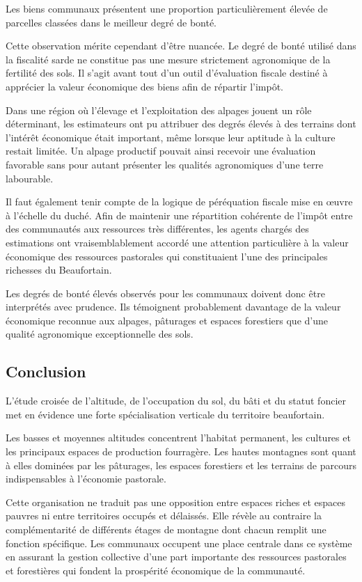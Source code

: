 \documentclass[12pt,a4paper]{report}
\begin{document}
	
	Les biens communaux présentent une proportion particulièrement élevée de parcelles classées dans le meilleur degré de bonté.
	
	Cette observation mérite cependant d'être nuancée. Le degré de bonté utilisé dans la fiscalité sarde ne constitue pas une mesure strictement agronomique de la fertilité des sols. Il s'agit avant tout d'un outil d'évaluation fiscale destiné à apprécier la valeur économique des biens afin de répartir l'impôt.
	
	Dans une région où l'élevage et l'exploitation des alpages jouent un rôle déterminant, les estimateurs ont pu attribuer des degrés élevés à des terrains dont l'intérêt économique était important, même lorsque leur aptitude à la culture restait limitée. Un alpage productif pouvait ainsi recevoir une évaluation favorable sans pour autant présenter les qualités agronomiques d'une terre labourable.
	
	Il faut également tenir compte de la logique de péréquation fiscale mise en œuvre à l'échelle du duché. Afin de maintenir une répartition cohérente de l'impôt entre des communautés aux ressources très différentes, les agents chargés des estimations ont vraisemblablement accordé une attention particulière à la valeur économique des ressources pastorales qui constituaient l'une des principales richesses du Beaufortain.
	
	Les degrés de bonté élevés observés pour les communaux doivent donc être interprétés avec prudence. Ils témoignent probablement davantage de la valeur économique reconnue aux alpages, pâturages et espaces forestiers que d'une qualité agronomique exceptionnelle des sols.
	
\subsection{Conclusion}
	
	L'étude croisée de l'altitude, de l'occupation du sol, du bâti et du statut foncier met en évidence une forte spécialisation verticale du territoire beaufortain.
	
	Les basses et moyennes altitudes concentrent l'habitat permanent, les cultures et les principaux espaces de production fourragère. Les hautes montagnes sont quant à elles dominées par les pâturages, les espaces forestiers et les terrains de parcours indispensables à l'économie pastorale.
	
	Cette organisation ne traduit pas une opposition entre espaces riches et espaces pauvres ni entre territoires occupés et délaissés. Elle révèle au contraire la complémentarité de différents étages de montagne dont chacun remplit une fonction spécifique. Les communaux occupent une place centrale dans ce système en assurant la gestion collective d'une part importante des ressources pastorales et forestières qui fondent la prospérité économique de la communauté.
	
\end{document}
